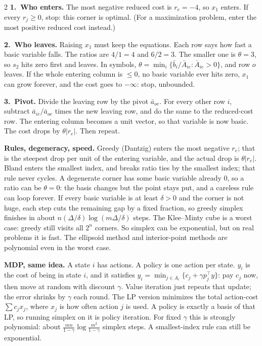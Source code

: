 \documentclass{article}
\newcommand{\kw}[1]{\textbf{#1}}
\begin{document}
\begin{multicols}{2}
\kw{1.\ Who enters.} The most negative reduced cost is $r_e=-4$, so $x_1$ enters. If every $r_j\ge 0$, stop: this corner is optimal. (For a maximization problem, enter the most positive reduced cost instead.)

\kw{2.\ Who leaves.} Raising $x_1$ must keep the equations. Each row says how fast a basic variable falls. The ratios are $4/1=4$ and $6/2=3$. The smaller one is $\theta=3$, so $s_2$ hits zero first and leaves. In symbols, $\theta=\min_i\{\bar b_i/\bar A_{ie}:\bar A_{ie}>0\}$, and row $o$ leaves. If the whole entering column is $\le 0$, no basic variable ever hits zero, $x_1$ can grow forever, and the cost goes to $-\infty$: stop, unbounded.

\kw{3.\ Pivot.} Divide the leaving row by the pivot $\bar a_{oe}$. For every other row $i$, subtract $\bar a_{ie}/\bar a_{oe}$ times the new leaving row, and do the same to the reduced-cost row. The entering column becomes a unit vector, so that variable is now basic. The cost drops by $\theta|r_e|$. Then repeat.

\kw{Rules, degeneracy, speed.} Greedy (Dantzig) enters the most negative $r_e$; that is the steepest drop per unit of the entering variable, and the actual drop is $\theta|r_e|$. Bland enters the smallest index, and breaks ratio ties by the smallest index; that rule never cycles. A degenerate corner has some basic variable already $0$, so a ratio can be $\theta=0$: the basis changes but the point stays put, and a careless rule can loop forever. If every basic variable is at least $\delta>0$ and the corner is not huge, each step cuts the remaining gap by a fixed fraction, so greedy simplex finishes in about $n(\Delta/\delta)\log(m\Delta/\delta)$ steps. The Klee--Minty cube is a worst case: greedy still visits all $2^n$ corners. So simplex can be exponential, but on real problems it is fast. The ellipsoid method and interior-point methods are polynomial even in the worst case.

\kw{MDP, same idea.} A state $i$ has actions. A policy is one action per state. $y_i$ is the cost of being in state $i$, and it satisfies $y_i=\min_{j\in A_i}\{c_j+\gamma p_j^\top y\}$: pay $c_j$ now, then move at random with discount $\gamma$. Value iteration just repeats that update; the error shrinks by $\gamma$ each round. The LP version minimizes the total action-cost $\sum c_j x_j$, where $x_j$ is how often action $j$ is used. A policy is exactly a basis of that LP, so running simplex on it is policy iteration. For fixed $\gamma$ this is strongly polynomial: about $\frac{mn}{1-\gamma}\log\frac{m^2}{1-\gamma}$ simplex steps. A smallest-index rule can still be exponential.


\end{multicols}
\end{document}
